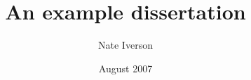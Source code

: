 \documentclass{BGSU}
\title{An example dissertation}
\author{Nate Iverson}
\date{August 2007}
\begin{document}
\frontmatter   %

\maketitle     %

\copyrightpage %

\begin{abstract}

\end{abstract}

\begin{dedication}

\end{dedication}

\begin{acknowledgments}

\end{acknowledgments}

\tableofcontents
\pagebreak
\listoffigures
\pagebreak
\listoftables

\begin{preface}

\end{preface}

\mainmatter %







\backmatter




\mbox{}\newpage
{}
\appendix

\end{document}
